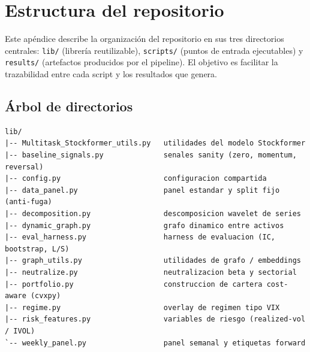 \chapter{Estructura del repositorio}\label{ap:repo}

Este apéndice describe la organización del repositorio en sus tres directorios
centrales: \texttt{lib/} (librería reutilizable), \texttt{scripts/} (puntos de
entrada ejecutables) y \texttt{results/} (artefactos producidos por el pipeline).
El objetivo es facilitar la trazabilidad entre cada script y los resultados que
genera.

\section{Árbol de directorios}

\begin{verbatim}
lib/
|-- Multitask_Stockformer_utils.py   utilidades del modelo Stockformer
|-- baseline_signals.py              senales sanity (zero, momentum, reversal)
|-- config.py                        configuracion compartida
|-- data_panel.py                    panel estandar y split fijo (anti-fuga)
|-- decomposition.py                 descomposicion wavelet de series
|-- dynamic_graph.py                 grafo dinamico entre activos
|-- eval_harness.py                  harness de evaluacion (IC, bootstrap, L/S)
|-- graph_utils.py                   utilidades de grafo / embeddings
|-- neutralize.py                    neutralizacion beta y sectorial
|-- portfolio.py                     construccion de cartera cost-aware (cvxpy)
|-- regime.py                        overlay de regimen tipo VIX
|-- risk_features.py                 variables de riesgo (realized-vol / IVOL)
`-- weekly_panel.py                  panel semanal y etiquetas forward


\end{verbatim}
